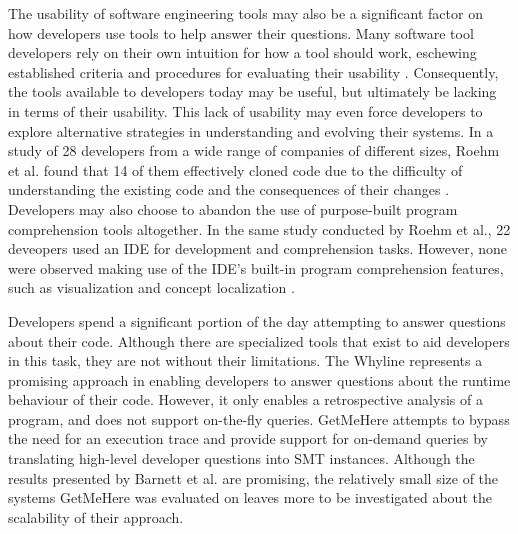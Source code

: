 \par The usability of software engineering tools may also be a significant
factor on how developers use tools to help answer their questions.
Many software tool developers rely on their own intuition for how a tool should
work, eschewing established criteria and procedures for evaluating their 
usability \cite{toleman-98-soft-tools}.
Consequently, the tools available to developers today may be useful, but
ultimately be lacking in terms of their usability.
This lack of usability may even force developers to explore alternative
strategies in understanding and evolving their systems.
In a study of 28 developers from a wide range of companies of different sizes,
Roehm et al. found that 14 of them effectively cloned code due to the
difficulty of understanding the existing code and the consequences of their
changes \cite{roehm-2012-comprehend-software}.
Developers may also choose to abandon the use of purpose-built program
comprehension tools altogether.
In the same study conducted by Roehm et al., 22 deveopers used an IDE
for development and comprehension tasks.
However, none were observed making use of the IDE's built-in program 
comprehension features, such as visualization and concept localization
\cite{roehm-2012-comprehend-software}.

\par Developers spend a significant portion of the day attempting to answer
questions about their code.
Although there are specialized tools that exist to aid developers in this task,
they are not without their limitations. 
The Whyline represents a promising approach in enabling developers to answer 
questions about the runtime behaviour of their code.
However, it only enables a retrospective analysis of a program, and does not 
support on-the-fly queries.
GetMeHere attempts to bypass the need for an execution trace and provide support
for on-demand queries by translating high-level developer questions into SMT
instances. 
Although the results presented by Barnett et al. are promising, the
relatively small size of the systems GetMeHere was evaluated on leaves more to
be investigated about the scalability of their approach.

\endinput

TODO: add a paragraph about what my thesis attempts to contribute (in relation
to the related work section).

